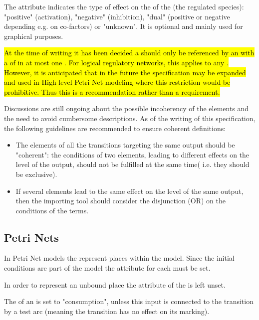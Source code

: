 The  attribute indicates the type of effect on the \Output of the \Transition (the regulated species): "positive" (activation), "negative" (inhibition), "dual" (positive or negative depending e.g. on co-factors) or "unknown". It is optional and mainly used for graphical purposes.


\hl{At the time of writing it has been decided a \QualitativeSpecies should only be referenced by an \Output with a  of   in at most one \Transition. For logical regulatory networks, this applies to any \Output.  However, it is anticipated that in the future the specification may be expanded and used in High level Petri Net modeling where this restriction would be prohibitive. Thus this is a recommendation rather than a requirement.  }


Discussions are still ongoing about the possible incoherency of the  elements and the need to avoid cumbersome descriptions. As of the writing of this specification, the following guidelines are recommended to ensure coherent definitions:
\begin{itemize}
\item The  elements of all the transitions targeting the same output should be "coherent": the conditions of two  elements, leading to different effects on the level of the output, should not be fulfilled at the same time( i.e. they should be exclusive).
\item If several  elements lead to the same effect on the level of the same output, then the importing tool should consider the disjunction (OR) on the conditions of the terms. 
\end{itemize}
 
\subsection{Petri Nets}

In Petri Net models the \QualitativeSpecies represent places within the model. Since the initial conditions are part of the model the  attribute for each \QualitativeSpecies must be set.

In order to represent an unbound place the  attribute of the \QualitativeSpecies is left unset.

\pagebreak
The  of an  is set to "consumption", unless this input is connected to the transition by a test arc (meaning the transition has no effect on its marking). 

